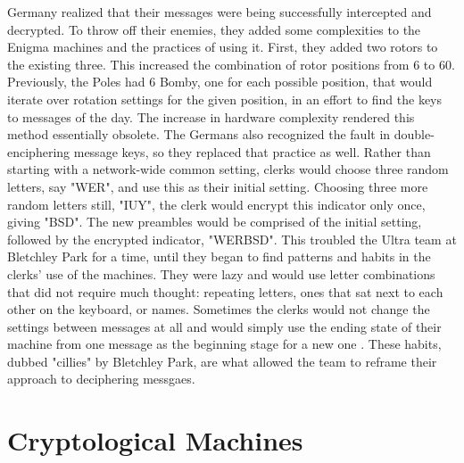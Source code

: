 Germany realized that their messages were being successfully intercepted and decrypted. To throw off their enemies, they added some complexities to the Enigma machines and the practices of using it. First, they added two rotors to the existing three. This increased the combination of rotor positions from 6 to 60. Previously, the Poles had 6 Bomby, one for each possible position, that would iterate over rotation settings for the given position, in an effort to find the keys to messages of the day. The increase in hardware complexity rendered this method essentially obsolete. The Germans also recognized the fault in double-enciphering message keys, so they replaced that practice as well. Rather than starting with a network-wide common setting, clerks would choose three random letters, say "WER", and use this as their initial setting. Choosing three more random letters still, "IUY", the clerk would encrypt this indicator only once, giving "BSD". The new preambles would be comprised of the initial setting, followed by the encrypted indicator, "WERBSD". This troubled the Ultra team at Bletchley Park for a time, until they began to find patterns and habits in the clerks' use of the machines. They were lazy and would use letter combinations that did not require much thought: repeating letters, ones that sat next to each other on the keyboard, or names. Sometimes the clerks would not change the settings between messages at all and would simply use the ending state of their machine from one message as the beginning stage for a new one \cite{mf01}. These habits, dubbed "cillies" by Bletchley Park, are what allowed the team to reframe their approach to deciphering messgaes.

\section{Cryptological Machines}

